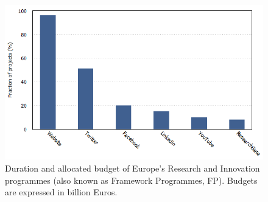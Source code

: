 \begin{figure}[!t] 
 \begin{center}
 \includegraphics[scale=0.4]{Images/Social_media.png}
 \caption{Duration and allocated budget of Europe's Research and Innovation programmes (also known as Framework Programmes, FP). Budgets are expressed in billion Euros.}
 \label{FP_funds}
 \end{center}
\end{figure}